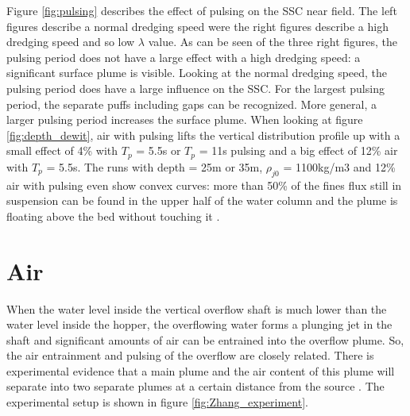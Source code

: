 
\noindent Figure \ref{fig:pulsing} describes the effect of pulsing on the SSC near field. The left figures describe a normal dredging speed were the right figures describe a high dredging speed and so low $\lambda$ value. As can be seen of the three right figures, the pulsing period does not have a large effect with a high dredging speed: a significant surface plume is visible. Looking at the normal dredging speed, the pulsing period does have a large influence on the SSC. For the largest pulsing period, the separate puffs including gaps can be recognized. More general, a larger pulsing period increases the surface plume. \newline \noindent
When looking at figure \ref{fig:depth_dewit}, air with pulsing lifts the vertical distribution profile up with a small effect of 4\% with $T_p$ =  5.5s or $T_p$ =  11s pulsing and a big effect of 12\% air with $T_p$ =  5.5s. The runs with depth = 25m or 35m, $\rho_{j0}$ =  1100kg/m3 and 12\% air with pulsing even show convex curves: more than 50\% of the fines flux still in suspension can be found in the upper half of the water column and the plume is floating above the bed without touching it \citep{Dewit}.











\section{Air}
\label{sec:air}
When the water level inside the vertical overflow shaft is much lower than the water level inside the hopper, the overflowing water forms a plunging jet in the shaft and significant amounts of air can be entrained into the overflow plume. So, the air entrainment and pulsing of the overflow are closely related. There is experimental evidence that a main plume and the air content of this plume will separate into two separate plumes at a certain distance from the source \citep{Zhang+}. The experimental setup is shown in figure \ref{fig:Zhang_experiment}.

